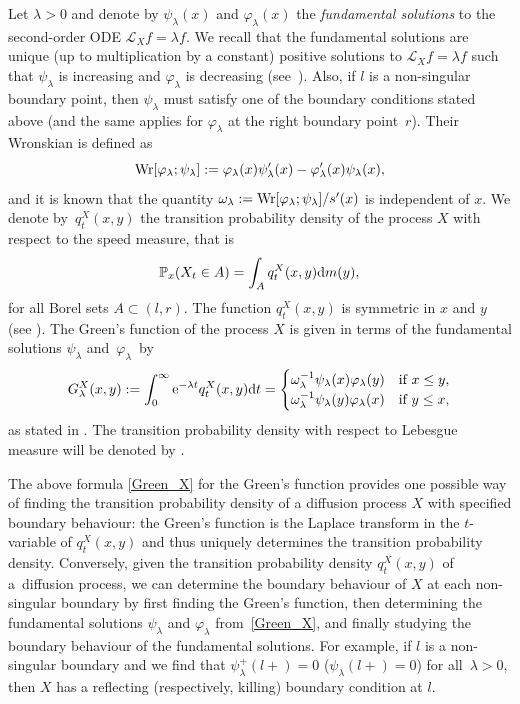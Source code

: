 \documentclass[pdftex]{sigma}
\numberwithin{equation}{section}
\theoremstyle{definition}
\def\L{{\mathcal L}}
\def\p{{\mathbb P}}
\def\wr{{\textnormal{Wr}}}
\def\d{{\textnormal d}}
\begin{document}
Let $\lambda>0$ and denote by $\psi_{\lambda}(x)$ and $\varphi_{\lambda}(x)$ the {\it fundamental solutions} to the second-order ODE $\L_X f=\lambda f$. We recall that the fundamental solutions are unique (up to multiplication by a constant) positive solutions to $\L_X f=\lambda f$ such that $\psi_{\lambda}$ is increasing and $\varphi_{\lambda}$ is decreasing
(see~\cite[Section II.10]{Borodin2002}). Also, if $l$ is a non-singular boundary point, then $\psi_{\lambda}$ must satisfy one of the boundary conditions stated above (and the same applies for $\varphi_{\lambda}$ at the right boundary point~$r$). Their Wronskian is defined as
 \begin{equation*}
\wr[\varphi_{\lambda}; \psi_{\lambda}]:=\varphi_{\lambda}(x) \psi'_{\lambda}(x)- \varphi'_{\lambda}(x)\psi_{\lambda}(x),
 \end{equation*}
 and it is known that the quantity $\omega_{\lambda}:=\wr[\varphi_{\lambda}; \psi_{\lambda}]/s'(x)$ is independent of $x$. We denote by~$q^X_t(x,y)$ the transition probability density of the process $X$ with respect to the speed measure, that is
 \[
 \p_x(X_t \in A)=\int_A q^X_t(x,y) \d m(y),
 \]
 for all Borel sets $ A \subset (l,r)$.
 The function $q^X_t(x,y)$ is symmetric in $x$ and $y$ (see \cite[Section~II.4]{Borodin2002}). The Green's function of the process $X$ is given in terms of the fundamental solutions $\psi_{\lambda}$ and~$\varphi_{\lambda}$~by
\begin{gather}\label{Green_X}
 G^X_{\lambda}(x,y):=
 \int_0^{\infty} {\rm e}^{-\lambda t} q^X_t(x,y) \d t=
 \begin{cases}
 \omega_{\lambda}^{-1} \psi_{\lambda}(x) \varphi_{\lambda}(y) & \text{if } x\le y, \\
 \omega_{\lambda}^{-1} \psi_{\lambda}(y) \varphi_{\lambda}(x)  & \text{if } y\le x,
 \end{cases}
\end{gather}
as stated in \cite[Section II.11]{Borodin2002}. The transition probability density with respect to Lebesgue measure will be denoted by
.

The above formula \eqref{Green_X} for the Green's function provides one possible way of finding the transition probability density of a diffusion process $X$ with specified boundary behaviour: the Green's function is the Laplace transform in the $t$-variable of $q_{t}^X(x,y)$ and thus uniquely determines the transition probability density. Conversely, given the transition probability density $q_t^{X}(x,y)$ of a~diffusion process, we can determine the boundary behaviour of $X$ at each non-singular boundary by first finding the Green's function, then determining the fundamental solutions $\psi_{\lambda}$ and $\varphi_{\lambda}$ from~\eqref{Green_X}, and finally studying the boundary behaviour of the fundamental solutions. For example, if $l$ is a non-singular boundary and we find that $\psi_{\lambda}^+(l+)=0$ ($\psi_{\lambda}(l+)=0$) for all~${\lambda>0}$, then $X$ has a reflecting (respectively, killing) boundary condition at $l$.
\end{document}
